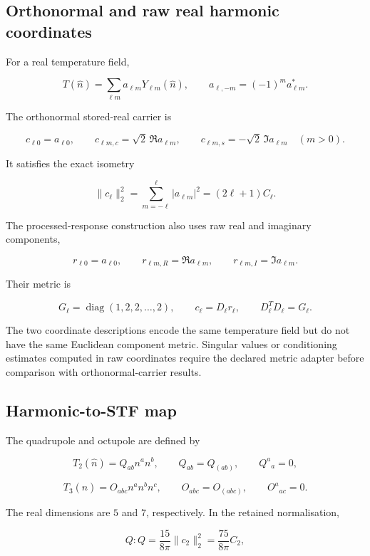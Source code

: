 \documentclass[
  11pt,
  a4paper]{article}
\begin{document}
\hypertarget{orthonormal-and-raw-real-harmonic-coordinates}{%
\subsection{Orthonormal and raw real harmonic coordinates}\label{orthonormal-and-raw-real-harmonic-coordinates}}

For a real temperature field,

\[
T(\hat n)=\sum_{\ell m}a_{\ell m}Y_{\ell m}(\hat n),
\qquad a_{\ell,-m}=(-1)^m a_{\ell m}^{*}.
\]

The orthonormal stored-real carrier is

\[
c_{\ell0}=a_{\ell0},\qquad
c_{\ell m,c}=\sqrt2\,\Re a_{\ell m},\qquad
c_{\ell m,s}=-\sqrt2\,\Im a_{\ell m}
\quad(m>0).
\]

It satisfies the exact isometry

\[
\|c_\ell\|_2^2
=\sum_{m=-\ell}^{\ell}|a_{\ell m}|^2
=(2\ell+1)C_\ell.
\]

The processed-response construction also uses raw real and imaginary components,

\[
r_{\ell0}=a_{\ell0},\qquad
r_{\ell m,R}=\Re a_{\ell m},\qquad
r_{\ell m,I}=\Im a_{\ell m}.
\]

Their metric is

\[
G_\ell=\operatorname{diag}(1,2,2,\ldots,2),
\qquad c_\ell=D_\ell r_\ell,
\qquad D_\ell^TD_\ell=G_\ell.
\]

The two coordinate descriptions encode the same temperature field but do not have the same Euclidean component metric. Singular values or conditioning estimates computed in raw coordinates require the declared metric adapter before comparison with orthonormal-carrier results.

\hypertarget{harmonic-to-stf-map}{%
\subsection{Harmonic-to-STF map}\label{harmonic-to-stf-map}}

The quadrupole and octupole are defined by

\[
T_2(\hat n)=Q_{ab}n^a n^b,
\qquad Q_{ab}=Q_{(ab)},\qquad Q^a{}_a=0,
\]

\[
T_3(\hat n)=O_{abc}n^a n^b n^c,
\qquad O_{abc}=O_{(abc)},\qquad O^a{}_{ac}=0.
\]

The real dimensions are \(5\) and \(7\), respectively. In the retained normalisation,

\[
\boxed{Q:Q=\frac{15}{8\pi}\|c_2\|_2^2
=\frac{75}{8\pi}C_2},
\]
\end{document}
